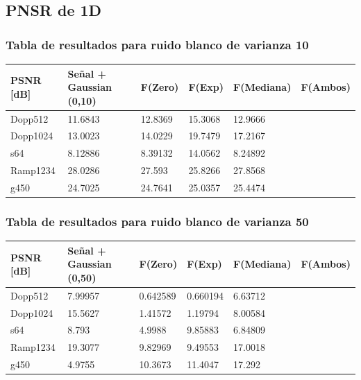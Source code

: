 \newpage
\subsection{PNSR de 1D}

\subsubsection{Tabla de resultados para ruido blanco de varianza 10}

\begin{table}[H]
        \begin{tabular}{|l|lllll|}
                \hline
                \textbf{PSNR [dB]} & Se\~nal + Gaussian (0,10) & F(Zero) & F(Exp) & F(Mediana) & F(Ambos) \\ \hline
                    Dopp512 & 11.6843 & 12.8369 & 15.3068 & 12.9666  \\
                    Dopp1024 & 13.0023 & 14.0229 & 19.7479 & 17.2167  \\
                    s64 & 8.12886 & 8.39132 & 14.0562 & 8.24892 \\
                    Ramp1234 & 28.0286 & 27.593 & 25.8266 & 27.8568  \\
                    g450 & 24.7025 & 24.7641 & 25.0357 & 25.4474  \\ \hline
                    \end{tabular}
                \end{table}


\subsubsection{Tabla de resultados para ruido blanco de varianza 50}

\begin{table}[H]
        \begin{tabular}{|l|lllll|}
                \hline
                \textbf{PSNR [dB]} & Se\~nal + Gaussian (0,50) & F(Zero) & F(Exp) & F(Mediana) & F(Ambos) \\ \hline
                    Dopp512 & 7.99957 & 0.642589 & 0.660194 & 6.63712 \\
                    Dopp1024 & 15.5627 & 1.41572 & 1.19794 & 8.00584    \\
                    s64 & 8.793 & 4.9988 & 9.85883 &  6.84809 \\
                    Ramp1234 & 19.3077 & 9.82969 & 9.49553 & 17.0018  \\
                    g450 & 4.9755 & 10.3673 & 11.4047 & 17.292   \\ \hline
                    \end{tabular}
                \end{table}




